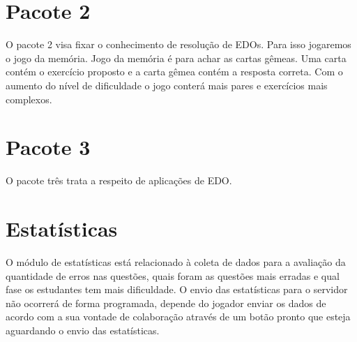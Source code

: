 \section[Pacote 2]{Pacote 2}
O pacote 2 visa fixar o conhecimento de resolução de EDOs. Para isso jogaremos o jogo da memória.
Jogo da memória é para achar as cartas gêmeas. Uma carta contém o exercício proposto e a carta gêmea contém a resposta correta. Com o aumento do nível de dificuldade o jogo conterá mais pares e exercícios mais complexos. 


\section[Pacote 3]{Pacote 3}

O pacote três trata a respeito de aplicações de EDO.

\section[Estatísticas]{Estatísticas}
O módulo de estatísticas está relacionado à coleta de dados para a avaliação da quantidade de erros nas questões, quais foram as questões mais erradas e qual fase os estudantes tem mais dificuldade. O envio das estatísticas para o servidor não ocorrerá de forma programada, depende do jogador enviar os dados de acordo com a sua vontade de colaboração através de um botão pronto que esteja aguardando o envio das estatísticas.

